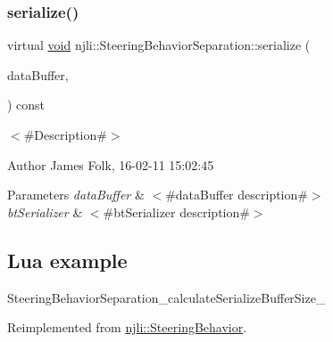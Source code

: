 \mbox{\label{classnjli_1_1_steering_behavior_separation_ac784949adb0c8903b1c30fd89c92e5d1}} 
\subsubsection{\texorpdfstring{serialize()}{serialize()}}
{\footnotesize\ttfamily virtual \mbox{\hyperlink{_thread_8h_af1e856da2e658414cb2456cb6f7ebc66}{void}} njli\+::\+Steering\+Behavior\+Separation\+::serialize (\begin{DoxyParamCaption}\item[{\mbox{\hyperlink{_thread_8h_af1e856da2e658414cb2456cb6f7ebc66}{void}} $\ast$}]{data\+Buffer,  }\item[{bt\+Serializer $\ast$}]{ }\end{DoxyParamCaption}) const\hspace{0.3cm}{\ttfamily [virtual]}}



$<$\#\+Description\#$>$ 

\begin{DoxyAuthor}{Author}
James Folk, 16-\/02-\/11 15\+:02\+:45
\end{DoxyAuthor}

\begin{DoxyParams}{Parameters}
{\em data\+Buffer} & $<$\#data\+Buffer description\#$>$ \\
\hline
{\em bt\+Serializer} & $<$\#bt\+Serializer description\#$>$\\
\hline
\end{DoxyParams}
\hypertarget{classnjli_1_1_steering_behavior_wander_ex1}{}\subsection{Lua example}\label{classnjli_1_1_steering_behavior_wander_ex1}

\begin{DoxyCodeInclude}
\end{DoxyCodeInclude}
Steering\+Behavior\+Separation\+\_\+calculate\+Serialize\+Buffer\+Size\+\_\+ 

Reimplemented from \mbox{\hyperlink{classnjli_1_1_steering_behavior_aa8494cb4a327c0040f64cfe8b393786e}{njli\+::\+Steering\+Behavior}}.

